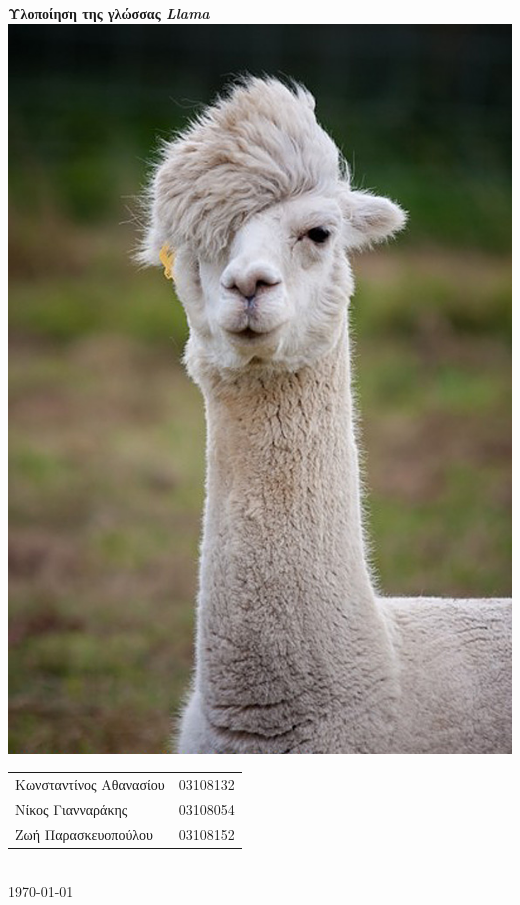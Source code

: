 \documentclass[12pt]{article}
\newcommand{\Llama}{\textit{Llama }}
\begin{document}
\begin{titlepage}
\begin{center}
\vspace{1.5em}
{\LARGE \textbf{Υλοποίηση της γλώσσας \Llama\\}}
\vspace{1cm}
\includegraphics[scale=0.4]{llama.jpg}\\
\vfill
\begin{tabular}{l l}
Kωνσταντίνος Αθανασίου & 03108132\\
Νίκος Γιανναράκης & 03108054 \\
Ζωή Παρασκευοπούλου & 03108152 \\
\end{tabular}\\
\bigskip
\today
\end{center}
\end{titlepage}
\tableofcontents

\pagebreak
\end{document}
